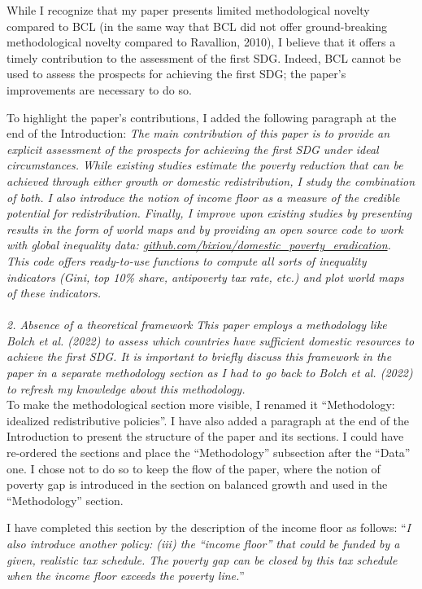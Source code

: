 \documentclass[12pt,english]{article}
\begin{document}
While I recognize that my paper presents limited methodological novelty compared to BCL (in the same way that BCL did not offer ground-breaking methodological novelty compared to Ravallion, 2010), I believe that it offers a timely contribution to the assessment of the first SDG. Indeed, BCL cannot be used to assess the prospects for achieving the first SDG; the paper's improvements are necessary to do so. 

To highlight the paper's contributions, I added the following paragraph at the end of the Introduction: \textit{The main contribution of this paper is to provide an explicit assessment of the prospects for achieving the first SDG under ideal circumstances. While existing studies estimate the poverty reduction that can be achieved through either growth or domestic redistribution, I study the combination of both. I also introduce the notion of \textit{income floor} as a measure of the credible potential for redistribution. Finally, I improve upon existing studies by presenting results in the form of world maps and by providing an open source code to work with global inequality data: \href{https://github.com/bixiou/domestic_poverty_eradication}{github.com/bixiou/domestic\_poverty\_eradication}. This code offers ready-to-use functions to compute all sorts of inequality indicators (Gini, top 10\% share, antipoverty tax rate, etc.) and plot world maps of these indicators.}
~\\ ~\\

\textit{2.	Absence of a theoretical framework}
\textit{This paper employs a methodology like Bolch et al. (2022) to assess which countries have sufficient domestic resources to achieve the first SDG. It is important to briefly discuss this framework in the paper in a separate methodology section as I had to go back to Bolch et al. (2022) to refresh my knowledge about this methodology. }~\\

To make the methodological section more visible, I renamed it ``Methodology: idealized redistributive policies''. I have also added a paragraph at the end of the Introduction to present the structure of the paper and its sections. I could have re-ordered the sections and place the ``Methodology'' subsection after the ``Data'' one. I chose not to do so to keep the flow of the paper, where the notion of poverty gap is introduced in the section on balanced growth and used in the ``Methodology'' section.

I have completed this section by the description of the income floor as follows: ``\textit{I also introduce another policy: (iii) the ``income floor'' that could be funded by a given, realistic tax schedule. The poverty gap can be closed by this tax schedule when the income floor exceeds the poverty line.}'' 
\end{document}
